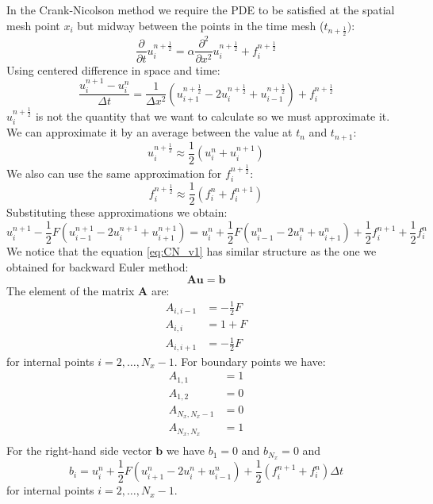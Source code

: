 \documentclass[a4paper,11pt]{article}
\begin{document}
In the Crank-Nicolson method we require the PDE to be satisfied at the spatial
mesh point $x_{i}$ but midway between the points in the time mesh ($t_{n+\frac{1}{2}})$:
%
\begin{equation}
\frac{\partial}{\partial t} u_{i}^{n+\frac{1}{2}} =
\alpha\frac{\partial^2}{\partial x^2} u_{i}^{n+\frac{1}{2}} + 
f_{i}^{n+\frac{1}{2}}
\end{equation}
%
Using centered difference in space and time:
%
\begin{equation}
\frac{u_{i}^{n+1} - u_{i}^{n}}{\Delta t} = 
\frac{1}{\Delta x^2} \left(
u_{i+1}^{n+\frac{1}{2}} - 2u_{i}^{n+\frac{1}{2}} + u_{i-1}^{n+\frac{1}{2}}
\right) + f_{i}^{n+\frac{1}{2}}
\end{equation}
%
$u_{i}^{n+\frac{1}{2}}$ is not the quantity that we want to calculate so
we must approximate it.
We can approximate it by an average between the value at $t_n$ and $t_{n+1}$:
\begin{equation}
u_{i}^{n+\frac{1}{2}} \approx \frac{1}{2}( u_{i}^{n} + u_{i}^{n+1} )
\end{equation}
We also can use the same approximation for $f_{i}^{n+\frac{1}{2}}$:
\begin{equation}
f_{i}^{n+\frac{1}{2}} \approx \frac{1}{2}( f_{i}^{n} + f_{i}^{n+1} )
\end{equation}
%
Substituting these approximations we obtain:
%
\begin{equation}
u_{i}^{n+1} - \frac{1}{2} F \left( u_{i-1}^{n+1} - 2u^{n+1}_{i} + u^{n+1}_{i+1} \right) =
u_{i}^{n} + \frac{1}{2} F \left( u_{i-1}^{n} - 2u^{n}_{i} + u^{n}_{i+1} \right) +
\frac{1}{2} f_{i}^{n+1} + \frac{1}{2} f_{i}^{n}
\label{eq:CN_v1}
\end{equation}
%
We notice that the equation \eqref{eq:CN_v1} has similar structure as the one we obtained
for backward Euler method:
%
\begin{equation}
\mathbf{A}\mathbf{u} = \mathbf{b}
\end{equation}
%
The element of the matrix $\mathbf{A}$ are:
%
\begin{align*}
A_{i,i-1} & = -\frac{1}{2}F \\
A_{i,i}   & = 1 + F \\
A_{i,i+1} & = -\frac{1}{2}F
\end{align*}
%
for internal points $i = 2,\ldots,N_{x}-1$. For boundary points we have:
%
\begin{align*}
A_{1,1} & = 1 \\
A_{1,2} & = 0 \\
A_{N_{x},N_{x}-1} & = 0 \\
A_{N_{x},N_{x}} & = 1 \\
\end{align*}
%
For the right-hand side vector $\mathbf{b}$ we have $b_{1} = 0$ and $b_{N_x} = 0$ and
\begin{equation}
b_{i} = u^{n}_{i} + \frac{1}{2}F \left( u^{n}_{i+1} -2u^{n}_{i} + u^{n}_{i-1} \right) +
\frac{1}{2} \left( f_{i}^{n+1} + f_{i}^{n} \right) \Delta t
\end{equation}
for internal points $i = 2, \ldots, N_{x}-1$.
\end{document}
